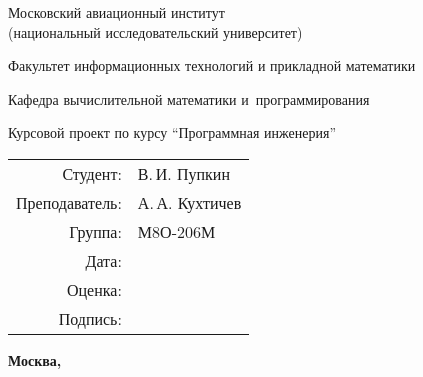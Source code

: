 \begin{titlepage}
\begin{center}
\bfseries

{\Large Московский авиационный институт\\ (национальный исследовательский университет)

}

\vspace{48pt}

{\large Факультет информационных технологий и прикладной математики
}

\vspace{36pt}

{\large Кафедра вычислительной математики и~программирования

}


\vspace{48pt}

Курсовой проект по курсу \enquote{Программная инженерия}

\end{center}

\vspace{72pt}

\begin{flushright}
\begin{tabular}{rl}
Студент: & В.\,И. Пупкин \\
Преподаватель: & А.\,А. Кухтичев \\
Группа: & М8О-206М \\
Дата: & \\
Оценка: & \\
Подпись: & \\
\end{tabular}
\end{flushright}

\vfill

\begin{center}
\bfseries
Москва, \the\year
\end{center}
\end{titlepage}

\pagebreak

